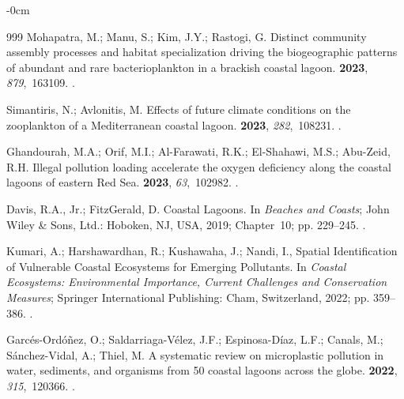 \documentclass[jmse,article,accept,pdftex,oneauthor]{Definitions/mdpi}
\begin{document}
\begin{adjustwidth}{-\extralength}{0cm}
\begin{thebibliography}{999}
Mohapatra, M.; Manu, S.; Kim, J.Y.; Rastogi, G.
\newblock Distinct community assembly processes and habitat specialization
  driving the biogeographic patterns of abundant and rare bacterioplankton in a
  brackish coastal lagoon.
 {\bf 2023}, {\em 879},~163109.
.

Simantiris, N.; Avlonitis, M.
\newblock Effects of future climate conditions on the zooplankton of a
  Mediterranean coastal lagoon.
 {\bf 2023}, {\em
  282},~108231.
.

Ghandourah, M.A.; Orif, M.I.; Al-Farawati, R.K.; El-Shahawi, M.S.; Abu-Zeid,
  R.H.
\newblock Illegal pollution loading accelerate the oxygen deficiency along the
  coastal lagoons of eastern Red Sea.
 {\bf 2023}, {\em
  63},~102982.
.

Davis, R.A., Jr.; FitzGerald, D. Coastal Lagoons. In {\em Beaches and Coasts}; John Wiley \& Sons, Ltd.: {Hoboken, NJ, USA,} %
 2019; Chapter~10; pp. 229--245.
.

Kumari, A.; Harshawardhan, R.; Kushawaha, J.; Nandi, I., Spatial Identification
  of Vulnerable Coastal Ecosystems for Emerging Pollutants.
\newblock In {\em Coastal Ecosystems: Environmental Importance, Current
  Challenges and Conservation Measures}; Springer International Publishing:
  Cham,  Switzerland, 2022; pp. 359--386.
.

Garcés-Ordóñez, O.; Saldarriaga-Vélez, J.F.; Espinosa-Díaz, L.F.; Canals,
  M.; Sánchez-Vidal, A.; Thiel, M.
\newblock A systematic review on microplastic pollution in water, sediments,
  and organisms from 50 coastal lagoons across the globe.
 {\bf 2022}, {\em 315},~120366.
.


\end{thebibliography}
\end{adjustwidth}
\end{document}
